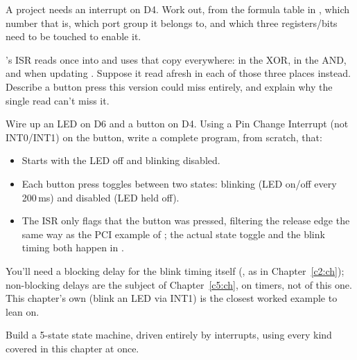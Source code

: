 \label{c3:set:3}

\label{c3:ex:5}
A project needs an interrupt on D4. Work out, from the formula table in , which
 number that is, which port group it belongs to, and which three registers/bits need to
be touched to enable it.

\label{c3:ex:6}
's ISR reads  once into  and uses that copy everywhere: in the
XOR, in the AND, and when updating . Suppose it read  afresh in each of those
three places instead. Describe a button press this version could miss entirely, and explain why the
single read can't miss it.

\label{c3:set:4}

\label{c3:ex:7}
Wire up an LED on D6 and a button on D4. Using a Pin Change Interrupt (not INT0/INT1) on the
button, write a complete program, from scratch, that:
\begin{itemize}
  \item Starts with the LED off and blinking disabled.
  \item Each button press toggles between two states: blinking (LED on/off every 200\,ms) and
    disabled (LED held off).
  \item The ISR only flags that the button was pressed, filtering the release edge the same way as
    the PCI example of ; the actual state toggle and the blink timing both happen in
    .
\end{itemize}
You'll need a blocking delay for the blink timing itself (, as in
Chapter~\ref{c2:ch}); non-blocking delays are the subject of Chapter~\ref{c5:ch}, on timers, not
of this one. This chapter's own  (blink an LED via INT1) is the closest worked
example to lean on.

\label{c3:ex:8}
Build a 5-state state machine, driven entirely by interrupts, using every kind covered in this
chapter at once.

